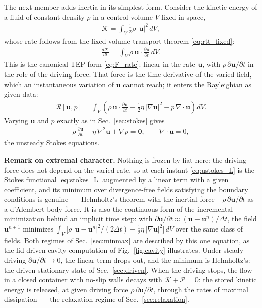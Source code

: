 \documentclass[aip,pof,reprint,amsmath,amssymb,longbibliography]{revtex4-2}
\begin{document}
The next member adds inertia in its simplest form. Consider the kinetic energy of a fluid of constant density $\rho$ in a control volume $V$ fixed in space,
\begin{align}
    \mathcal{K} = \int_V \frac{1}{2}\rho\,|\boldsymbol{u}|^2 \, dV, \label{eq:K_fixed}
\end{align}
whose rate follows from the fixed-volume transport theorem \eqref{eq:rtt_fixed}:
\begin{align}
    \frac{d\mathcal{K}}{dt} = \int_V \rho\, \boldsymbol{u} \cdot \frac{\partial \boldsymbol{u}}{\partial t} \, dV. \label{eq:K_rate_fixed}
\end{align}
This is the canonical TEP form \eqref{eq:F_rate}: linear in the rate $\boldsymbol{u}$, with $\rho\,\partial\boldsymbol{u}/\partial t$ in the role of the driving force. That force is the time derivative of the varied field, which an instantaneous variation of $\boldsymbol{u}$ cannot reach; it enters the Rayleighian as given data:
\begin{align}
    \mathcal{R}[\boldsymbol{u}, p] = \int_{V} \left( \rho\, \boldsymbol{u} \cdot \frac{\partial \boldsymbol{u}}{\partial t} + \frac{1}{2}\eta\,|\nabla \boldsymbol{u}|^2 - p\,\nabla \cdot \boldsymbol{u} \right) dV. \label{eq:ustokes_L}
\end{align}
Varying $\boldsymbol{u}$ and $p$ exactly as in Sec.~\ref{sec:stokes} gives
\begin{align}
    \rho\,\frac{\partial \boldsymbol{u}}{\partial t} - \eta\,\nabla^2 \boldsymbol{u} + \nabla p = \boldsymbol{0}, \qquad \nabla \cdot \boldsymbol{u} = 0, \label{eq:ustokes}
\end{align}
the unsteady Stokes equations.

\textbf{Remark on extremal character.} Nothing is frozen by fiat here: the driving force does not depend on the varied rate, so at each instant \eqref{eq:ustokes_L} is the Stokes functional \eqref{eq:stokes_L} augmented by a linear term with a given coefficient, and its minimum over divergence-free fields satisfying the boundary conditions is genuine~--- Helmholtz's theorem with the inertial force $-\rho\,\partial\boldsymbol{u}/\partial t$ as a d'Alembert body force. It is also the continuous form of the incremental minimization behind an implicit time step: with $\partial\boldsymbol{u}/\partial t \approx (\boldsymbol{u} - \boldsymbol{u}^n)/\Delta t$, the field $\boldsymbol{u}^{n+1}$ minimizes $\int_V \big[\rho\,|\boldsymbol{u}-\boldsymbol{u}^n|^2/(2\Delta t) + \tfrac{1}{2}\eta\,|\nabla\boldsymbol{u}|^2\big]\,dV$ over the same class of fields. Both regimes of Sec.~\ref{sec:minmax} are described by this one equation, as the lid-driven cavity computation of Fig.~\ref{fig:cavity} illustrates. Under steady driving $\partial\boldsymbol{u}/\partial t \to 0$, the linear term drops out, and the minimum is Helmholtz's: the driven stationary state of Sec.~\ref{sec:driven}. When the driving stops, the flow in a closed container with no-slip walls decays with $\dot{\mathcal{K}} + \mathcal{P} = 0$: the stored kinetic energy is released, at given driving force $\rho\,\partial\boldsymbol{u}/\partial t$, through the rates of maximal dissipation~--- the relaxation regime of Sec.~\ref{sec:relaxation}.
\end{document}
